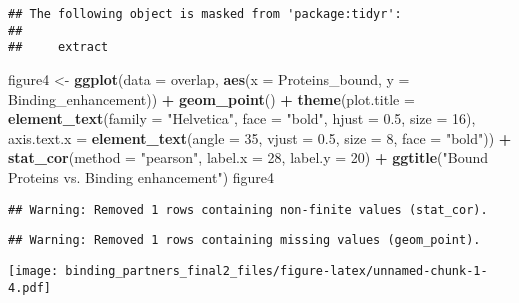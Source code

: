 \documentclass[]{article}
\newenvironment{Shaded}{\begin{snugshade}}{\end{snugshade}}
\newcommand{\DataTypeTok}[1]{\textcolor[rgb]{0.13,0.29,0.53}{#1}}
\newcommand{\DecValTok}[1]{\textcolor[rgb]{0.00,0.00,0.81}{#1}}
\newcommand{\FloatTok}[1]{\textcolor[rgb]{0.00,0.00,0.81}{#1}}
\newcommand{\KeywordTok}[1]{\textcolor[rgb]{0.13,0.29,0.53}{\textbf{#1}}}
\newcommand{\NormalTok}[1]{#1}
\newcommand{\OperatorTok}[1]{\textcolor[rgb]{0.81,0.36,0.00}{\textbf{#1}}}
\newcommand{\StringTok}[1]{\textcolor[rgb]{0.31,0.60,0.02}{#1}}
\begin{document}
\begin{verbatim}
## The following object is masked from 'package:tidyr':
## 
##     extract
\end{verbatim}

\begin{Shaded}
\begin{Highlighting}[]
\NormalTok{figure4 <-}\StringTok{ }\KeywordTok{ggplot}\NormalTok{(}\DataTypeTok{data =}\NormalTok{ overlap, }\KeywordTok{aes}\NormalTok{(}\DataTypeTok{x =}\NormalTok{ Proteins_bound, }\DataTypeTok{y =}\NormalTok{ Binding_enhancement)) }\OperatorTok{+}
\StringTok{  }\KeywordTok{geom_point}\NormalTok{() }\OperatorTok{+}\StringTok{ }\KeywordTok{theme}\NormalTok{(}\DataTypeTok{plot.title =} \KeywordTok{element_text}\NormalTok{(}\DataTypeTok{family =} \StringTok{"Helvetica"}\NormalTok{, }
                                                 \DataTypeTok{face =} \StringTok{"bold"}\NormalTok{, }\DataTypeTok{hjust =} \FloatTok{0.5}\NormalTok{, }\DataTypeTok{size =} \DecValTok{16}\NormalTok{),}
                       \DataTypeTok{axis.text.x =} \KeywordTok{element_text}\NormalTok{(}\DataTypeTok{angle =} \DecValTok{35}\NormalTok{, }\DataTypeTok{vjust =} \FloatTok{0.5}\NormalTok{, }\DataTypeTok{size =} \DecValTok{8}\NormalTok{, }\DataTypeTok{face =} \StringTok{"bold"}\NormalTok{)) }\OperatorTok{+}
\StringTok{  }\KeywordTok{stat_cor}\NormalTok{(}\DataTypeTok{method =} \StringTok{"pearson"}\NormalTok{, }\DataTypeTok{label.x =} \DecValTok{28}\NormalTok{, }\DataTypeTok{label.y =} \DecValTok{20}\NormalTok{) }\OperatorTok{+}
\StringTok{  }\KeywordTok{ggtitle}\NormalTok{(}\StringTok{"Bound Proteins vs. Binding enhancement"}\NormalTok{)}
\NormalTok{figure4}
\end{Highlighting}
\end{Shaded}

\begin{verbatim}
## Warning: Removed 1 rows containing non-finite values (stat_cor).
\end{verbatim}

\begin{verbatim}
## Warning: Removed 1 rows containing missing values (geom_point).
\end{verbatim}

\texttt{[image: binding\_partners\_final2\_files/figure-latex/unnamed-chunk-1-4.pdf]}
\end{document}
